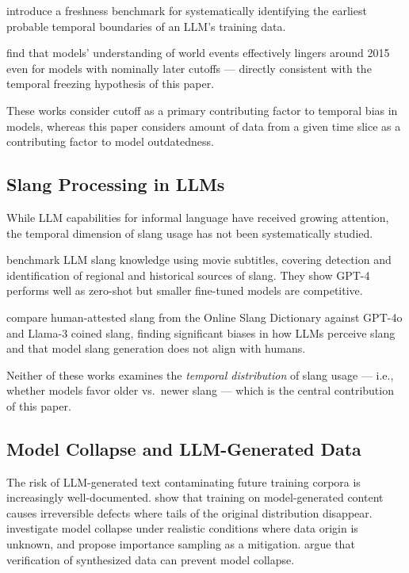 \documentclass[11pt]{article}
\begin{document}
\citet{llmlagbench2025} introduce a freshness benchmark for systematically identifying the earliest probable temporal boundaries of an LLM's training data. 

\citet{outdated2024} find that models' understanding of world events effectively lingers around 2015 even for models with nominally later cutoffs --- directly consistent with the temporal freezing hypothesis of this paper.

These works consider cutoff as a primary contributing factor to temporal bias in models, whereas this paper considers amount of data from a given time slice as a contributing factor to model outdatedness.

\subsection{Slang Processing in LLMs}

While LLM capabilities for informal language have received growing attention, the temporal dimension of slang usage has not been systematically studied.

\citet{sun2024slang} benchmark LLM slang knowledge using movie subtitles, covering detection and identification of regional and historical sources of slang. They show GPT-4 performs well as zero-shot but smaller fine-tuned models are competitive.

\citet{wu2025slang} compare human-attested slang from the Online Slang Dictionary against GPT-4o and Llama-3 coined slang, finding significant biases in how LLMs perceive slang and that model slang generation does not align with humans.

Neither of these works examines the \textit{temporal distribution} of slang usage --- i.e., whether models favor older vs.\ newer slang --- which is the central contribution of this paper.

\subsection{Model Collapse and LLM-Generated Data}

The risk of LLM-generated text contaminating future training corpora is increasingly well-documented. \citet{shumailov2023curse} show that training on model-generated content causes irreversible defects where
tails of the original distribution disappear. \citet{drayson2025mgtext}
investigate model collapse under realistic conditions where data origin is unknown, and propose importance sampling as a mitigation.
\citet{feng2024collapse} argue that verification of synthesized data can prevent model collapse.
\end{document}
